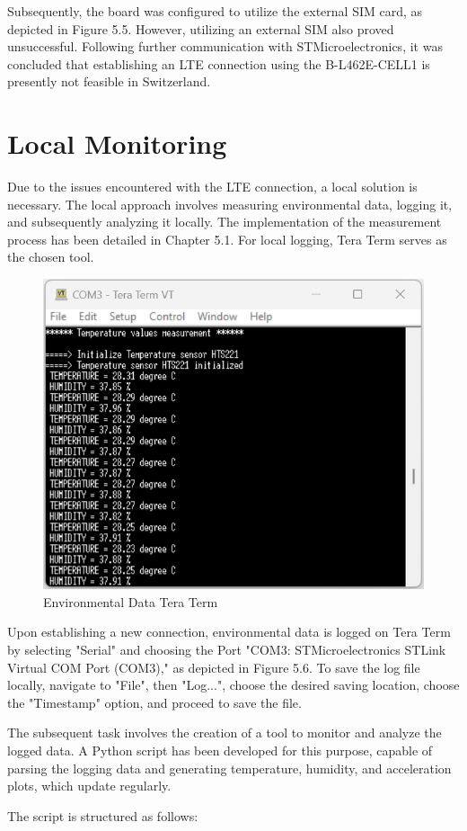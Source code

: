 Subsequently, the board was configured to utilize the external SIM card, as depicted in Figure 5.5.
However, utilizing an external SIM also proved unsuccessful. Following further communication with STMicroelectronics, it was concluded that establishing an LTE connection using the B-L462E-CELL1 is presently not feasible in Switzerland.

\section{Local Monitoring}
Due to the issues encountered with the LTE connection, a local solution is necessary. The local approach involves measuring environmental data, logging it, and subsequently analyzing it locally.
The implementation of the measurement process has been detailed in Chapter 5.1. For local logging, Tera Term serves as the chosen tool.

\begin{figure}[H]
    \centering
    \includegraphics[width=0.5\linewidth]{Environmental_Data.png}
    \caption{Environmental Data Tera Term}
    \label{fig:Environmental Data Tera Term}
\end{figure}

Upon establishing a new connection, environmental data is logged on Tera Term by selecting "Serial" and choosing the Port "COM3: STMicroelectronics STLink Virtual COM Port (COM3)," as depicted in Figure 5.6. To save the log file locally, navigate to "File", then "Log...", choose the desired saving location, choose the "Timestamp" option, and proceed to save the file.

The subsequent task involves the creation of a tool to monitor and analyze the logged data. A Python script has been developed for this purpose, capable of parsing the logging data and generating temperature, humidity, and acceleration plots, which update regularly.

The script is structured as follows:

